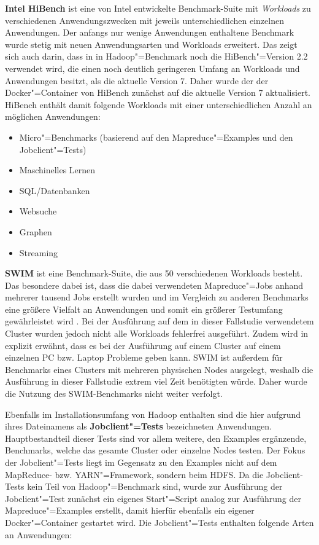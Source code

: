 \textbf{Intel HiBench} ist eine von Intel entwickelte Benchmark-Suite mit \emph{Workloads} zu verschiedenen Anwendungszwecken mit jeweils unterschiedlichen einzelnen Anwendungen.
Der anfangs nur wenige Anwendungen enthaltene Benchmark \cite{Huang2010} wurde stetig mit neuen Anwendungsarten und Workloads erweitert.
Das zeigt sich auch darin, dass in in Hadoop"=Benchmark noch die HiBench"=Version \mbox{2.2} verwendet wird, die einen noch deutlich geringeren Umfang an Workloads und Anwendungen besitzt, als die aktuelle Version 7.
Daher wurde der der Docker"=Container von HiBench zunächst auf die aktuelle Version 7 aktualisiert.
HiBench enthält damit folgende Workloads mit einer unterschiedlichen Anzahl an möglichen Anwendungen:

\begin{itemize}
    \item Micro"=Benchmarks (basierend auf den Mapreduce"=Examples und den Jobclient"=Tests)
    \item Maschinelles Lernen
    \item SQL/Datenbanken
    \item Websuche
    \item Graphen
    \item Streaming
\end{itemize}

\textbf{\ac{SWIM}} ist eine Benchmark-Suite, die aus 50 verschiedenen Workloads besteht.
Das besondere dabei ist, dass die dabei verwendeten Mapreduce"=Jobs anhand mehrerer tausend Jobs erstellt wurden und im Vergleich zu anderen Benchmarks eine größere Vielfalt an Anwendungen und somit ein größerer Testumfang gewährleistet wird \cite{SwimWikiHome}.
Bei der Ausführung auf dem in dieser Fallstudie verwendetem Cluster wurden jedoch nicht alle Workloads fehlerfrei ausgeführt.
Zudem wird in \cite{InriaTutorial} explizit erwähnt, dass es bei der Ausführung auf einem Cluster auf einem einzelnen PC bzw. Laptop Probleme geben kann.
SWIM ist außerdem für Benchmarks eines Clusters mit mehreren physischen Nodes ausgelegt, weshalb die Ausführung in dieser Fallstudie extrem viel Zeit benötigten würde.
Daher wurde die Nutzung des SWIM-Benchmarks nicht weiter verfolgt.

Ebenfalls im Installationsumfang von Hadoop enthalten sind die hier aufgrund ihres Dateinamens als \textbf{Jobclient"=Tests} bezeichneten Anwendungen.
Hauptbestandteil dieser Tests sind vor allem weitere, den Examples ergänzende, Benchmarks, welche das gesamte Cluster oder einzelne Nodes testen.
Der Fokus der Jobclient"=Tests liegt im Gegensatz zu den Examples nicht auf dem MapReduce- bzw. YARN"=Framework, sondern beim \ac{HDFS}.
Da die Jobclient-Tests kein Teil von Hadoop"=Benchmark sind, wurde zur Ausführung der Jobclient"=Test zunächst ein eigenes Start"=Script analog zur Ausführung der Mapreduce"=Examples erstellt, damit hierfür ebenfalls ein eigener Docker"=Container gestartet wird.
Die Jobclient"=Tests enthalten \uA folgende Arten an Anwendungen:


